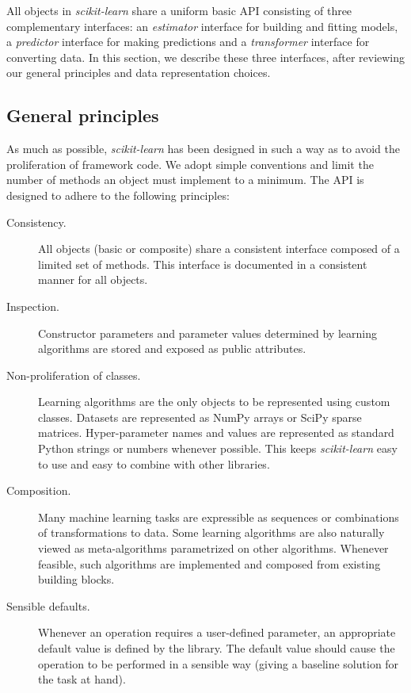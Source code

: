 \documentclass[twocolumn]{article}
\newcommand{\sklearn}{\textit{scikit-learn}\xspace}
\begin{document}
All objects in \sklearn share a uniform basic API consisting of three
complementary interfaces: an \textit{estimator} interface for building and
fitting models, a \textit{predictor} interface for making predictions and a
\textit{transformer} interface for converting data. In this section, we describe
these three interfaces, after reviewing our general principles and data
representation choices.

\subsection{General principles}

As much as possible, \sklearn has been designed in such a way
as to avoid the proliferation of framework code.
We adopt simple conventions and limit the number of methods
an object must implement to a minimum.
The API is designed to adhere to the following principles:

\begin{description}
  \item[Consistency.]
       All objects (basic or composite) share a consistent interface composed of
       a limited set of methods. This interface is documented in a consistent
       manner for all objects.
  \item[Inspection.]
       Constructor parameters and parameter values determined by learning
       algorithms are stored and exposed as public attributes.
  \item[Non-proliferation of classes.]
       Learning algorithms are the only objects to be represented using custom classes.
       Datasets are represented as NumPy arrays or SciPy sparse matrices.
       Hyper-parameter names and values are represented as standard
       Python strings or numbers whenever possible.
       This keeps \sklearn easy to use and easy to combine with other libraries.
  \item[Composition.]
       Many machine learning tasks are expressible
       as sequences or combinations of transformations to data.
       Some learning algorithms are also naturally viewed
       as meta-algorithms parametrized on other algorithms.
       Whenever feasible, such algorithms are implemented and composed from
       existing building blocks.
  \item[Sensible defaults.]
       Whenever an operation requires a user-defined parameter,
       an appropriate default value is defined by the library.
       The default value should cause the operation to be performed
       in a sensible way (giving a baseline solution for the task at hand).
\end{description}
\end{document}
